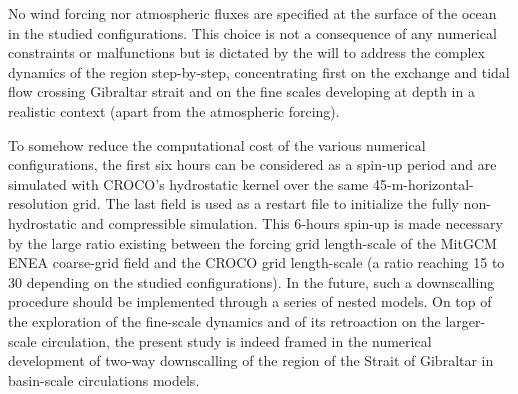 No wind forcing nor atmospheric fluxes are specified at the surface of the ocean in the studied configurations. This choice is not a consequence of any numerical constraints or malfunctions but is dictated by the will to address the complex dynamics of the region step-by-step, concentrating first on the exchange and tidal flow crossing Gibraltar strait and on the fine scales developing at depth in a realistic context (apart from the atmospheric forcing).%

To somehow reduce the computational cost of the various numerical configurations, the first six hours can be considered as a spin-up period and are simulated with CROCO's hydrostatic kernel over the same 45-m-horizontal-resolution grid. The last field is used as a restart file to initialize the fully non-hydrostatic and compressible simulation. This 6-hours spin-up is made necessary by the large ratio existing between the forcing grid length-scale of the MitGCM ENEA coarse-grid field and the CROCO grid length-scale (a ratio reaching 15 to 30 depending on the studied configurations). In the future, such a downscalling procedure should be implemented through a series of nested models. On top of the exploration of the fine-scale dynamics and of its retroaction on the larger-scale circulation, the present study is indeed framed in the numerical development of two-way downscalling of the region of the Strait of Gibraltar in basin-scale circulations models.

